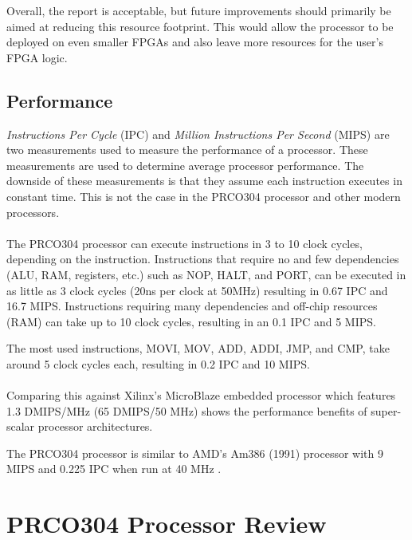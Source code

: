 \documentclass[11pt,a4paper]{report}
\newcommand{\scname}{PRCO304}
\begin{document}
Overall, the report is acceptable, but future improvements should primarily be aimed at reducing this resource footprint. This would allow the processor to be deployed on even smaller FPGAs and also leave more resources for the user's FPGA logic.

\subsection{Performance}
\textit{Instructions Per Cycle} (IPC) and \textit{Million Instructions Per Second} (MIPS) are two measurements used to measure the performance of a processor. These measurements are used to determine average processor performance. The downside of these measurements is that they assume each instruction executes in constant time. This is not the case in the \scname{} processor and other modern processors.
\\\\
The \scname{} processor can execute instructions in 3 to 10 clock cycles, depending on the instruction. Instructions that require no and few dependencies (ALU, RAM, registers, etc.) such as NOP, HALT, and PORT, can be executed in as little as 3 clock cycles (20ns per clock at 50MHz) resulting in 0.67 IPC and 16.7 MIPS. Instructions requiring many dependencies and off-chip resources (RAM) can take up to 10 clock cycles, resulting in an 0.1 IPC and 5 MIPS.

The most used instructions, MOVI, MOV, ADD, ADDI, JMP, and CMP, take around 5 clock cycles each, resulting in 0.2 IPC and 10 MIPS.
\\\\
Comparing this against Xilinx's MicroBlaze embedded processor which features 1.3 DMIPS/MHz (65 DMIPS/50 MHz) shows the performance benefits of super-scalar processor architectures. 

The \scname{} processor is similar to AMD's Am386 (1991) processor with 9 MIPS and 0.225 IPC when run at 40 MHz \cite{am386}.


\section{\scname{} Processor Review}
\end{document}
